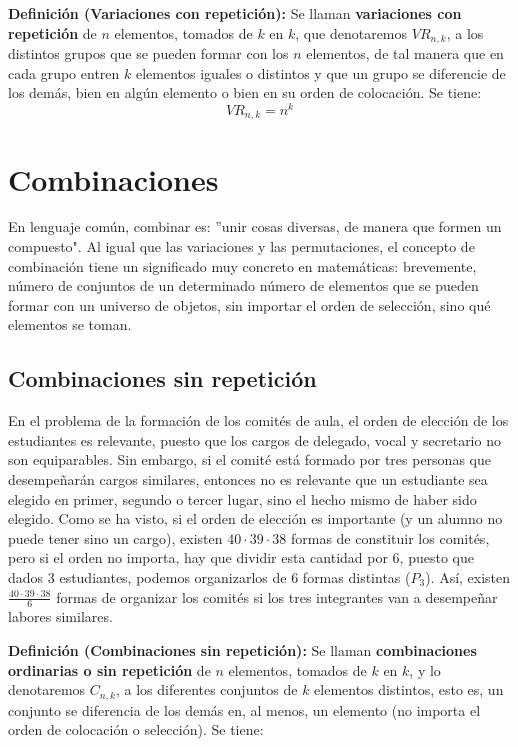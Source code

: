 \documentclass[12pt]{article}
\theoremstyle{definition}
\theoremstyle{plain}
\theoremstyle{plain}
\theoremstyle{definition}
\begin{document}
        \textbf{Definición (Variaciones con repetición):}
        Se llaman \textbf{variaciones con repetición} de $n$ elementos, tomados de $k$ en $k$, que denotaremos $VR_{n,k}$, a los distintos grupos que se pueden formar con los $n$ elementos, de tal manera que en cada grupo entren $k$ elementos iguales o distintos y que un grupo se diferencie de los demás, bien en algún elemento o bien en su orden de colocación. Se tiene: $$VR_{n,k} = n^k$$

\section{Combinaciones}

    En lenguaje común, combinar es: ''unir cosas diversas, de manera que formen un compuesto". Al igual que las variaciones y las permutaciones, el concepto de combinación tiene un significado muy concreto en matemáticas: brevemente, número de conjuntos de un determinado número de elementos que se pueden formar con un universo de objetos, sin importar el orden de selección, sino qué elementos se toman.

    \subsection{Combinaciones sin repetición}

        En el problema de la formación de los comités de aula, el orden de elección de los estudiantes es relevante, puesto que los cargos de delegado, vocal y secretario no son equiparables. Sin embargo, si el comité está formado por tres personas que desempeñarán cargos similares, entonces no es relevante que un estudiante sea elegido en primer, segundo o tercer lugar, sino el hecho mismo de haber sido elegido. Como se ha visto, si el orden de elección es importante (y un alumno no puede tener sino un cargo), existen $40 \cdot 39 \cdot 38$ formas de constituir los comités, pero si el orden no importa, hay que dividir esta cantidad por $6$, puesto que dados $3$ estudiantes, podemos organizarlos de $6$ formas distintas ($P_3$). Así, existen $\frac{40 \cdot 39 \cdot 38}{6}$ formas de organizar los comités si los tres integrantes van a desempeñar labores similares.

        \textbf{Definición (Combinaciones sin repetición):}
        Se llaman \textbf{combinaciones ordinarias o sin repetición} de \(n\) elementos, tomados de \(k\) en \(k\), y lo denotaremos \(C_{n,k}\), a los diferentes conjuntos de \(k\) elementos distintos, esto es, un conjunto se diferencia de los demás en, al menos, un elemento (no importa el orden de colocación o selección). Se tiene:
\end{document}

